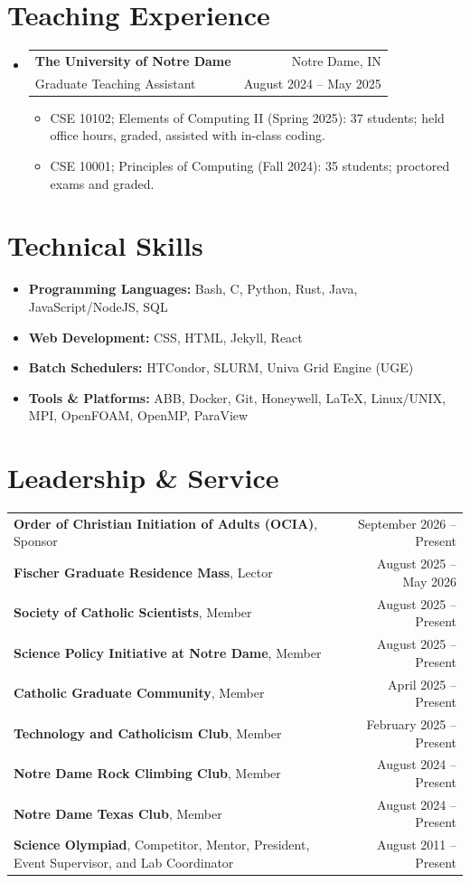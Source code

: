 \documentclass[letterpaper,11pt]{article}
\makeatletter
\newcommand{\cvitem}[1]{
  \item\small{
    {#1\vspace{-2pt}}
  }
}
\newcommand{\cvheading}[4]{
  \vspace{-2pt}\item
    \begin{tabular*}{\textwidth}[t]{l@{\extracolsep{\fill}}r}
      \textbf{#1} & #2 \\
      \small#3 & \small #4 \\
    \end{tabular*}\vspace{-7pt}
}
\newcommand{\cvheadingstart}{\begin{itemize}[leftmargin=0in, label={}]}
\newcommand{\cvheadingend}{\end{itemize}\vspace{-5pt}}
\newcommand{\cvitemstart}{\begin{itemize}\justifying}
\newcommand{\cvitemend}{\end{itemize}\vspace{-5pt}}
\makeatother
\begin{document}
\section{Teaching Experience}
    \cvheadingstart
        \cvheading
            {The University of Notre Dame}{Notre Dame, IN}
            {Graduate Teaching Assistant}{August 2024 -- May 2025}
            \begin{small}
                \begin{itemize}
                    \item CSE 10102; Elements of Computing II (Spring 2025): 37 students; held office hours, graded, assisted with in-class coding.
                    \item CSE 10001; Principles of Computing (Fall 2024): 35 students; proctored exams and graded.
                \end{itemize}
            \end{small}
    \cvheadingend


\section{Technical Skills}
    \cvitemstart
        \cvitem{\textbf{Programming Languages:} Bash, C, Python, Rust, Java, JavaScript/NodeJS, SQL}
        \cvitem{\textbf{Web Development:} CSS, HTML, Jekyll, React}
        \cvitem{\textbf{Batch Schedulers:} HTCondor, SLURM, Univa Grid Engine (UGE)}
        \cvitem{\textbf{Tools \& Platforms:} ABB, Docker, Git, Honeywell, \LaTeX, Linux/UNIX, MPI, OpenFOAM, OpenMP, ParaView}
    \cvitemend


\section{Leadership \& Service}
    \begin{small}
    \begin{tabularx}{\textwidth}{@{} X r @{}}
        \textbf{Order of Christian Initiation of Adults (OCIA)}, Sponsor & September 2026 -- Present \\
        \textbf{Fischer Graduate Residence Mass}, Lector & August 2025 -- May 2026 \\
        \textbf{Society of Catholic Scientists}, Member & August 2025 -- Present \\
        \textbf{Science Policy Initiative at Notre Dame}, Member & August 2025 -- Present \\
        \textbf{Catholic Graduate Community}, Member & April 2025 -- Present \\
        \textbf{Technology and Catholicism Club}, Member & February 2025 -- Present \\
        \textbf{Notre Dame Rock Climbing Club}, Member & August 2024 -- Present \\
        \textbf{Notre Dame Texas Club}, Member & August 2024 -- Present \\
        \textbf{Science Olympiad}, Competitor, Mentor, President, Event Supervisor, and Lab Coordinator & August 2011 -- Present \\
    \end{tabularx}
    \end{small}
\end{document}
